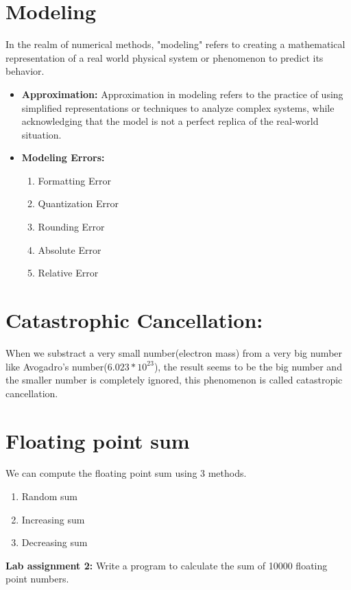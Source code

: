 \documentclass{article}
\begin{document}
\section{Modeling}
In the realm of numerical methods, "modeling" refers to creating a mathematical representation of a real world physical system or phenomenon to predict its behavior. 
\begin{itemize}
    \item \textbf{Approximation: } Approximation in modeling refers to the practice of using simplified representations or techniques to analyze complex systems, while acknowledging that the model is not a perfect replica of the real-world situation.

    \item \textbf{Modeling Errors: }
    \begin{enumerate}
\item Formatting Error

\item Quantization Error

\item Rounding Error

\item Absolute Error

\item Relative Error

\end{enumerate}
    
\end{itemize}

\section{Catastrophic Cancellation:}
When we substract a very small number(electron mass) from a very big number like Avogadro's number($6.023 * 10^{23}$), the result seems to be the big number and the smaller number is completely ignored, this phenomenon is called catastropic cancellation.

\section{Floating point sum}
We can compute the floating point sum using 3 methods.
\begin{enumerate}
\item Random sum

\item Increasing sum

\item Decreasing sum

\end{enumerate}
\textbf{Lab assignment 2:} Write a program to calculate the sum of 10000 floating point numbers.
\end{document}
